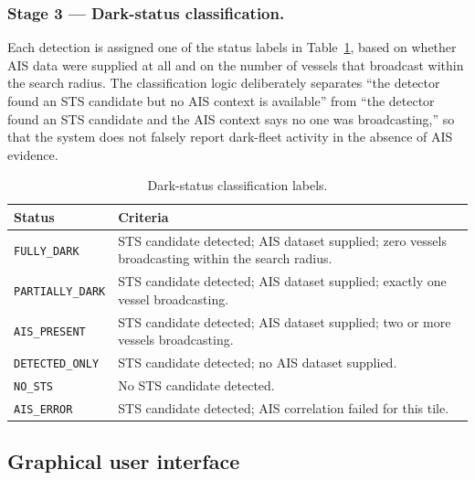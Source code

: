 \documentclass[10pt, letterpaper, twocolumn]{article}
\begin{document}
\subsubsection{Stage 3 --- Dark-status classification.}
Each detection is assigned one of the status labels in Table~\ref{tab:dark-status}, based on whether AIS data were supplied at all and on the number of vessels that broadcast within the search radius. The classification logic deliberately separates ``the detector found an STS candidate but no AIS context is available'' from ``the detector found an STS candidate and the AIS context says no one was broadcasting,'' so that the system does not falsely report dark-fleet activity in the absence of AIS evidence.

\begin{table}[h]
\caption{Dark-status classification labels.}
\label{tab:dark-status}
\begin{tabular}{p{2.1cm} p{4.2cm}}
\toprule
\textbf{Status} & \textbf{Criteria} \\
\midrule
\texttt{FULLY\_DARK}     & STS candidate detected; AIS dataset supplied; zero vessels broadcasting within the search radius. \\
\texttt{PARTIALLY\_DARK} & STS candidate detected; AIS dataset supplied; exactly one vessel broadcasting. \\
\texttt{AIS\_PRESENT}    & STS candidate detected; AIS dataset supplied; two or more vessels broadcasting. \\
\texttt{DETECTED\_ONLY}  & STS candidate detected; no AIS dataset supplied. \\
\texttt{NO\_STS}         & No STS candidate detected. \\
\texttt{AIS\_ERROR}      & STS candidate detected; AIS correlation failed for this tile. \\
\bottomrule
\end{tabular}
\end{table}

\subsection{Graphical user interface}
\end{document}
